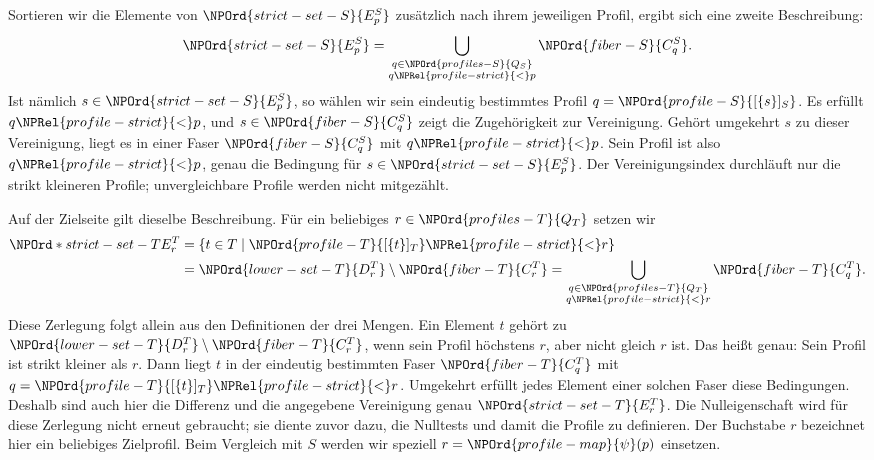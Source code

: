 Sortieren wir die Elemente von \(\NPOrd{strict-set-S}{E_p^S}\) zusätzlich nach ihrem
jeweiligen Profil, ergibt sich eine zweite Beschreibung:
\[
 \NPOrd{strict-set-S}{E_p^S}=\bigcup_{\substack{q\in \NPOrd{profiles-S}{Q_S}\\q\NPRel{profile-strict}{<}p}}\NPOrd{fiber-S}{C_q^S}.
\]
Ist nämlich \(s\in \NPOrd{strict-set-S}{E_p^S}\), so wählen wir sein eindeutig bestimmtes
Profil \(q=\NPOrd{profile-S}{[\{s\}]_S}\). Es erfüllt \(q\NPRel{profile-strict}{<}p\), und \(s\in \NPOrd{fiber-S}{C_q^S}\)
zeigt die Zugehörigkeit zur Vereinigung. Gehört umgekehrt \(s\)
zu dieser Vereinigung, liegt es in einer Faser \(\NPOrd{fiber-S}{C_q^S}\) mit \(q\NPRel{profile-strict}{<}p\).
Sein Profil ist also \(q\NPRel{profile-strict}{<}p\), genau die Bedingung für \(s\in \NPOrd{strict-set-S}{E_p^S}\).
Der Vereinigungsindex durchläuft nur die strikt kleineren Profile;
unvergleichbare Profile werden nicht mitgezählt.

Auf der Zielseite gilt dieselbe Beschreibung. Für ein beliebiges
\(r\in \NPOrd{profiles-T}{Q_T}\) setzen wir
\[
 \begin{aligned}
 \NPOrd*{strict-set-T}{E_r^T}&=\{t\in T\mid\NPOrd{profile-T}{[\{t\}]_T}\NPRel{profile-strict}{<}r\}\\
      &=\NPOrd{lower-set-T}{D_r^T}\setminus \NPOrd{fiber-T}{C_r^T}
       =\bigcup_{\substack{q\in \NPOrd{profiles-T}{Q_T}\\q\NPRel{profile-strict}{<}r}}\NPOrd{fiber-T}{C_q^T}.
 \end{aligned}
\]
Diese Zerlegung folgt allein aus den Definitionen der drei Mengen.
Ein Element \(t\) gehört zu \(\NPOrd{lower-set-T}{D_r^T}\setminus
\NPOrd{fiber-T}{C_r^T}\), wenn sein Profil höchstens \(r\), aber nicht
gleich \(r\) ist. Das heißt genau: Sein Profil ist strikt kleiner
als \(r\). Dann liegt \(t\) in der eindeutig bestimmten Faser
\(\NPOrd{fiber-T}{C_q^T}\) mit
\(q=\NPOrd{profile-T}{[\{t\}]_T}\NPRel{profile-strict}{<}r\).
Umgekehrt erfüllt jedes Element einer solchen Faser diese Bedingungen.
Deshalb sind auch hier die Differenz und die angegebene Vereinigung
genau \(\NPOrd{strict-set-T}{E_r^T}\).
Die Nulleigenschaft wird für diese Zerlegung nicht erneut gebraucht;
sie diente zuvor dazu, die Nulltests und damit die Profile zu definieren.
Der Buchstabe \(r\) bezeichnet hier ein beliebiges Zielprofil.
Beim Vergleich mit \(S\) werden wir speziell \(r=\NPOrd{profile-map}{\psi}(p)\) einsetzen.


